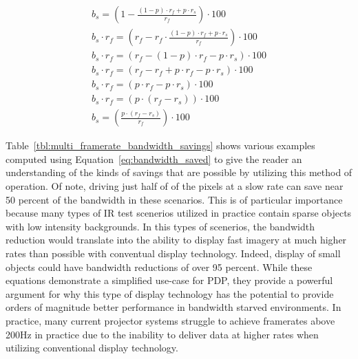     \begin{equation}
        \begin{array}{ l }
            \displaystyle b_s=\left(1-\frac{(1-p)\cdot r_f + p\cdot r_s}{r_f}\right)\cdot 100 \\[16pt]
            \displaystyle b_s \cdot r_f=\left(r_f-r_f \cdot \frac{(1-p)\cdot r_f + p\cdot r_s}{r_f}\right)\cdot 100 \\[13pt]
            \displaystyle b_s \cdot r_f= (r_f - (1-p)\cdot r_f - p\cdot r_s)\cdot 100 \\[13pt]
            \displaystyle b_s \cdot r_f= (r_f - r_f + p \cdot r_f - p\cdot r_s)\cdot 100 \\[13pt]
            \displaystyle b_s \cdot r_f= (p \cdot r_f - p\cdot r_s)\cdot 100 \\[13pt]
            \displaystyle b_s \cdot r_f= (p \cdot (r_f - r_s))\cdot 100 \\[13pt]
            \displaystyle b_s=\left(\frac{p \cdot (r_f-r_s)}{r_f}\right)\cdot 100
        \end{array}
        \label{eq:bandwidth_saved}
    \end{equation}

    Table~\ref{tbl:multi_framerate_bandwidth_savings} shows various examples computed using Equation~\eqref{eq:bandwidth_saved} to give the reader an understanding of the kinds of savings that are possible by utilizing this method of operation. Of note, driving just half of of the pixels at a slow rate can save near 50 percent of the bandwidth in these scenarios. This is of particular importance because many types of IR test scenerios utilized in practice contain sparse objects with low intensity backgrounds. In this types of scenerios, the bandwidth reduction would translate into the ability to display fast imagery at much higher rates than possible with conventual display technology. Indeed, display of small objects could have bandwidth reductions of over 95 percent. While these equations demonstrate a simplified use-case for PDP, they provide a powerful argument for why this type of display technology has the potential to provide orders of magnitude better performance in bandwidth starved environments. In practice, many current projector systems struggle to achieve framerates above 200Hz in practice due to the inability to deliver data at higher rates when utilizing conventional display technology.

